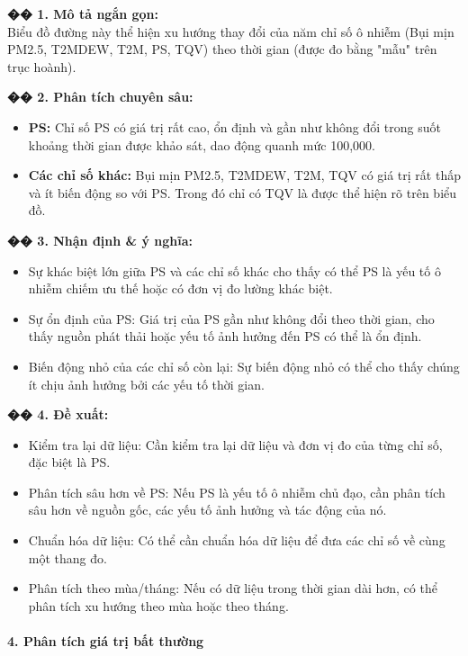 \documentclass[12pt,a4paper]{article}
\begin{document}
\begin{aibox}
\textbf{�� 1. Mô tả ngắn gọn:}\\
Biểu đồ đường này thể hiện xu hướng thay đổi của năm chỉ số ô nhiễm (Bụi mịn PM2.5, T2MDEW, T2M, PS, TQV) theo thời gian (được đo bằng "mẫu" trên trục hoành).

\textbf{�� 2. Phân tích chuyên sâu:}
\begin{itemize}
    \item \textbf{PS:} Chỉ số PS có giá trị rất cao, ổn định và gần như không đổi trong suốt khoảng thời gian được khảo sát, dao động quanh mức 100,000.
    \item \textbf{Các chỉ số khác:} Bụi mịn PM2.5, T2MDEW, T2M, TQV có giá trị rất thấp và ít biến động so với PS. Trong đó chỉ có TQV là được thể hiện rõ trên biểu đồ.
\end{itemize}

\textbf{�� 3. Nhận định \& ý nghĩa:}
\begin{itemize}
    \item Sự khác biệt lớn giữa PS và các chỉ số khác cho thấy có thể PS là yếu tố ô nhiễm chiếm ưu thế hoặc có đơn vị đo lường khác biệt.
    \item Sự ổn định của PS: Giá trị của PS gần như không đổi theo thời gian, cho thấy nguồn phát thải hoặc yếu tố ảnh hưởng đến PS có thể là ổn định.
    \item Biến động nhỏ của các chỉ số còn lại: Sự biến động nhỏ có thể cho thấy chúng ít chịu ảnh hưởng bởi các yếu tố thời gian.
\end{itemize}

\textbf{�� 4. Đề xuất:}
\begin{itemize}
    \item Kiểm tra lại dữ liệu: Cần kiểm tra lại dữ liệu và đơn vị đo của từng chỉ số, đặc biệt là PS.
    \item Phân tích sâu hơn về PS: Nếu PS là yếu tố ô nhiễm chủ đạo, cần phân tích sâu hơn về nguồn gốc, các yếu tố ảnh hưởng và tác động của nó.
    \item Chuẩn hóa dữ liệu: Có thể cần chuẩn hóa dữ liệu để đưa các chỉ số về cùng một thang đo.
    \item Phân tích theo mùa/tháng: Nếu có dữ liệu trong thời gian dài hơn, có thể phân tích xu hướng theo mùa hoặc theo tháng.
\end{itemize}
\end{aibox}

\paragraph{4. Phân tích giá trị bất thường}
\end{document}
